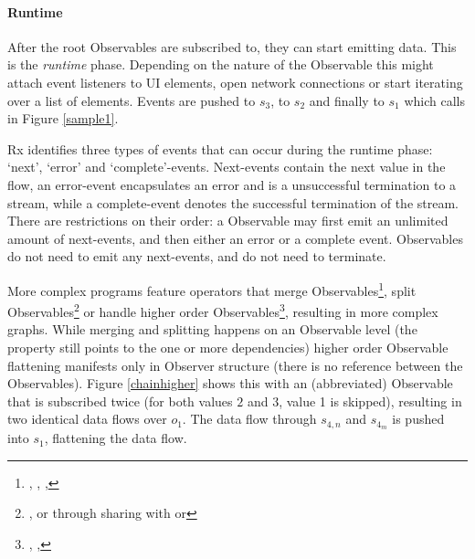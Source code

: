 \paragraph{Runtime} After the root Observables are subscribed to, they can start emitting data. This is the \textit{runtime} phase. Depending on the nature of the Observable this might attach event listeners to UI elements, open network connections or start iterating over a list of elements. Events are pushed to $s_3$, to $s_2$ and finally to $s_1$ which calls  in Figure \ref{sample1}. 

Rx identifies three types of events that can occur during the runtime phase: `next', `error' and `complete'-events. Next-events contain the next value in the flow, an error-event encapsulates an error and is a unsuccessful termination to a stream, while a complete-event denotes the successful termination of the stream. There are restrictions on their order: a Observable may first emit an unlimited amount of next-events, and then either an error or a complete event. Observables do not need to emit any next-events, and do not need to terminate.

More complex programs feature operators that merge Observables\footnote{
	, , , 
}, split Observables\footnote{
	, or through sharing with  or 
} or handle higher order Observables\footnote{
	, , 
}, resulting in more complex graphs. While merging and splitting happens on an Observable level (the  property still points to the one or more dependencies) higher order Observable flattening manifests only in Observer structure (there is no reference between the Observables). Figure \ref{chainhigher} shows this with an (abbreviated)  Observable that is subscribed twice (for both values $2$ and $3$, value 1 is skipped), resulting in two identical data flows over $o_1$. The data flow through $s_{4,n}$ and $s_{4_m}$ is pushed into $s_1$, flattening the data flow. 
